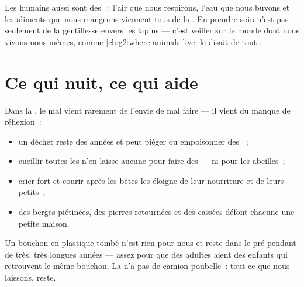 \begin{remark}\label{rem:g2:caring-for-nature:part}
Les humains aussi sont des ~: l'air que nous
respirons, l'eau que nous buvons et les aliments que nous mangeons
viennent tous de la . En prendre soin n'est pas seulement de
la gentillesse envers les lapins --- c'est veiller sur le monde dont
nous vivons nous-mêmes, comme
\cref{ch:g2:where-animals-live} le disait de tout .
\end{remark}

\section{Ce qui nuit, ce qui aide}

\begin{proposition}\label{prop:g2:caring-for-nature:harm}
Dans la , le mal vient rarement de l'envie de mal faire ---
il vient du manque de réflexion~:
\begin{itemize}
  \item un déchet reste des années et peut piéger ou empoisonner
        des ~;
  \item cueillir toutes les  n'en laisse aucune pour faire
        des  --- ni pour les abeilles~;
  \item crier fort et courir après les bêtes les éloigne de leur
        nourriture et de leurs petits~;
  \item des berges piétinées, des pierres retournées et des
         cassées défont chacune une petite maison.
\end{itemize}
\end{proposition}
\admitted

\begin{example}\label{ex:g2:caring-for-nature:cap}
Un bouchon en plastique tombé n'est rien pour nous et reste dans le
pré pendant de très, très longues années --- assez pour que des
adultes aient des enfants qui retrouvent le même bouchon. La 
n'a pas de camion-poubelle~: tout ce que nous laissons, reste.
\end{example}

